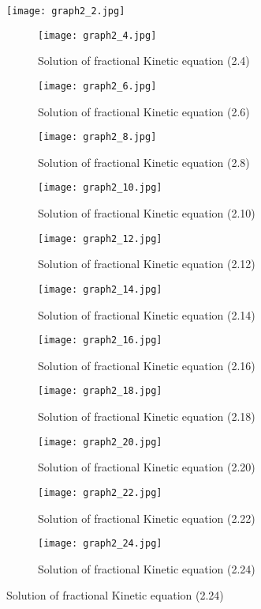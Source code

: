 \documentclass[leqno]{article}
\begin{document}
\begin{figure}[H]
    \centering
    \texttt{[image: graph2\_2.jpg]}
    \caption{Solution of fractional Kinetic equation (2.2)}
\begin{figure}[H]
    \centering
    \texttt{[image: graph2\_4.jpg]}
    \caption{Solution of fractional Kinetic equation (2.4)}
\end{figure}
\begin{figure}[H]
    \centering
    \texttt{[image: graph2\_6.jpg]}
    \caption{Solution of fractional Kinetic equation (2.6)}
\end{figure}
\begin{figure}[H]
    \centering
    \texttt{[image: graph2\_8.jpg]}
    \caption{Solution of fractional Kinetic equation (2.8)}
\end{figure}
\begin{figure}[H]
    \centering
    \texttt{[image: graph2\_10.jpg]}
    \caption{Solution of fractional Kinetic equation (2.10)}
\end{figure}
\begin{figure}[H]
    \centering
    \texttt{[image: graph2\_12.jpg]}
    \caption{Solution of fractional Kinetic equation (2.12)}
\end{figure}
\begin{figure}[H]
    \centering
    \texttt{[image: graph2\_14.jpg]}
    \caption{Solution of fractional Kinetic equation (2.14)}
\end{figure}
\begin{figure}[H]
    \centering
    \texttt{[image: graph2\_16.jpg]}
    \caption{Solution of fractional Kinetic equation (2.16)}
\end{figure}
\begin{figure}[H]
    \centering
    \texttt{[image: graph2\_18.jpg]}
    \caption{Solution of fractional Kinetic equation (2.18)}
\end{figure}
\begin{figure}[H]
    \centering
    \texttt{[image: graph2\_20.jpg]}
    \caption{Solution of fractional Kinetic equation (2.20)}
\end{figure}
\begin{figure}[H]
    \centering
    \texttt{[image: graph2\_22.jpg]}
    \caption{Solution of fractional Kinetic equation (2.22)}
\end{figure}
\begin{figure}[H]
    \centering
    \texttt{[image: graph2\_24.jpg]}
    \caption{Solution of fractional Kinetic equation (2.24)}
\end{figure}

\end{figure}
\end{document}
